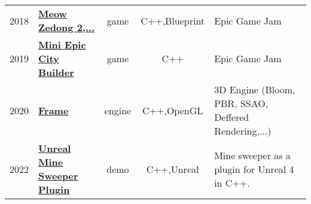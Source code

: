 \documentclass[a4paper]{deedy-resume} %
\begin{document}
\begin{tabular}{rlccl}
2018 & \textbf{\href{https://www.epicgamejam.com/games/meow-zedong-great-helmsman-future-chairman-urinal-leap-forward}{Meow Zedong 2,...}} & 
	game & C++,Blueprint & Epic Game Jam \\
2019 & \textbf{\href{https://www.epicgamejam.com/games/mini-epic-city-builder}{Mini Epic City Builder}} &
	game & C++ & Epic Game Jam \\
2020 & \textbf{\href{https://www.github.com/anirul/Frame}{Frame}} & 
	engine & C++,OpenGL & 3D Engine (Bloom, PBR, SSAO, Deffered Rendering,...) \\
2022 & \textbf{\href{https://github.com/anirul/UnrealMineSweeperTool}{Unreal Mine Sweeper Plugin}} &
	demo & C++,Unreal & Mine sweeper as a plugin for Unreal 4 in C++.
\end{tabular}










\end{document}
